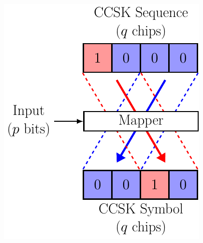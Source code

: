 \documentclass[../main.tex]{subfiles}
\begin{document}
\begin{frame}{\subsecname}
  \begin{columns}
    \begin{column}{.35\linewidth}
      \begin{overlayarea}{\linewidth}{.5\textheight}
        \centering
        \includegraphics[width=\linewidth, height=.5\textheight, keepaspectratio = true]{figures/tikzpicture/ccsk_simd_stdl.pdf}
      \end{overlayarea}
    \end{column}
    \begin{column}{.35\linewidth}
      \begin{overlayarea}{\linewidth}{.5\textheight}
        \centering

\end{overlayarea}
\end{column}
\end{columns}
\end{frame}
\end{document}
